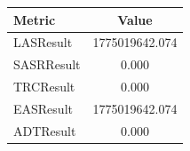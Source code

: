 \begin{table}[]
\centering
\begin{tabular}{|l|c|}
\hline
Metric & Value \\
\hline
LASResult & 1775019642.074 \\
SASRResult & 0.000 \\
TRCResult & 0.000 \\
EASResult & 1775019642.074 \\
ADTResult & 0.000 \\
\hline
\end{tabular}
\end{table}